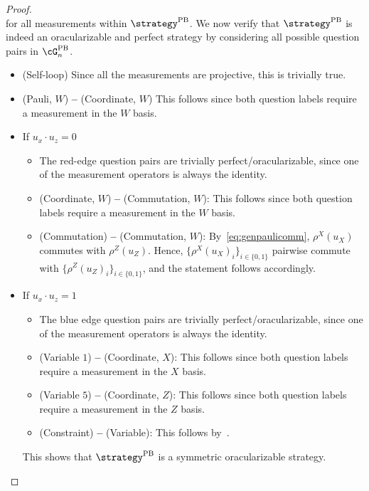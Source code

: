 \begin{proof}
\begin{equation*}
	\end{equation*}
	 for all measurements within $\strategy^{\text{PB}}$. We now verify that $\strategy^{\text{PB}}$ is indeed an oracularizable and perfect strategy by considering all possible question pairs in $\cG^{\text{PB}}_n$. 
	\begin{itemize}
		\item (Self-loop) Since all the measurements are projective, this is trivially true. 
		\item (Pauli, $W$) \textbf{--}  (Coordinate, $W$)  This follows since both question labels require a measurement in the $W$ basis. 
		\item  If $u_x \cdot u_z = 0$
		\begin{itemize}
			\item The red-edge question pairs are trivially perfect/oracularizable, since one of the measurement operators is always the identity. 
			\item  (Coordinate, $W$)  \color{red} \textbf{--}   \color{black} (Commutation, $W$): This follows since both question labels require a measurement in the $W$ basis. 
			\item  (Commutation)  \color{red} \textbf{--}   \color{black}  (Commutation, $W$): By~\eqref{eq:genpaulicomm}, $\rho^{X}(u_X)$ commutes with $\rho^{Z}(u_Z)$. Hence, $\{ \rho^{X}(u_X)_i\}_{i \in \{0,1\}}$ pairwise commute with $\{ \rho^{Z}(u_Z)_i\}_{i \in \{0,1\}}$, and the statement follows accordingly. 
		\end{itemize}
		\item If $u_x \cdot u_z = 1$
		\begin{itemize}
			\item The blue edge question pairs are trivially perfect/oracularizable, since one of the measurement operators is always the identity. 
			\item (Variable $1$)  \color{blue} \textbf{--}   \color{black}  (Coordinate, $X$):  This follows since both question labels require a measurement in the $X$ basis. 
			\item (Variable $5$)  \color{blue} \textbf{--}   \color{black}  (Coordinate, $Z$):  This follows since both question labels require a measurement in the $Z$ basis. 
			\item (Constraint)  \color{blue} \textbf{--}  \color{black}   (Variable): This follows by~\cite[Theorem 7.11]{jiMIPRE2022a}.
		\end{itemize}
		This shows that $\strategy^{\text{PB}}$ is a symmetric oracularizable strategy.
	\end{itemize}
\end{proof}

